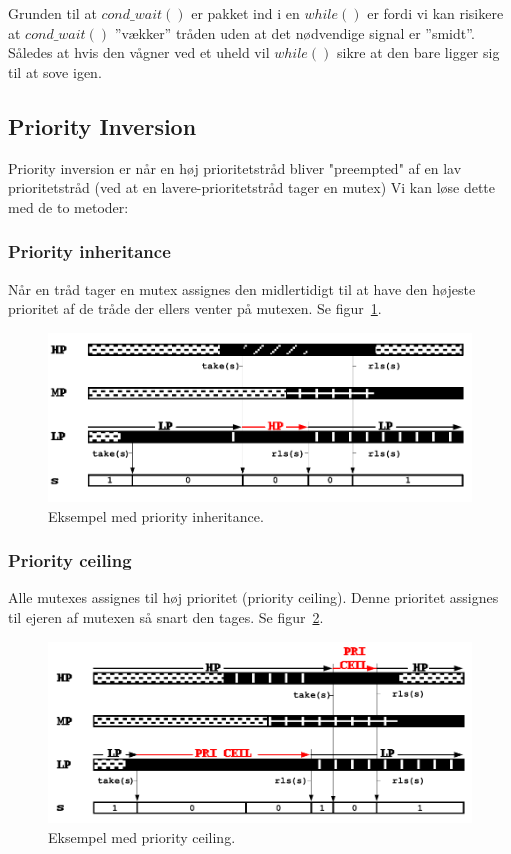 Grunden til at $cond\_wait()$ er pakket ind i en $while()$ er fordi vi kan risikere at $cond\_wait()$ ''vækker'' tråden uden at det nødvendige signal er ''smidt''. Således at hvis den vågner ved et uheld vil $while()$ sikre at den bare ligger sig til at sove igen.\\

\subsection{Priority Inversion}
Priority inversion er når en høj prioritetstråd bliver "preempted" af en lav prioritetstråd (ved at en lavere-prioritetstråd tager en mutex)
Vi kan løse dette med de to metoder:

\subsubsection{Priority inheritance}
Når en tråd tager en mutex assignes den midlertidigt til at have den højeste prioritet af de tråde der ellers venter på mutexen. Se figur~\ref{fig:inher}.
	
\begin{figure}[h]
	\centering
	\includegraphics[width=0.8\linewidth]{figs/spm2/inher}
	\caption{Eksempel med priority inheritance.}
	\label{fig:inher}
\end{figure}

\subsubsection{Priority ceiling}
Alle mutexes assignes til høj prioritet (priority ceiling). Denne prioritet assignes til ejeren af mutexen så snart den tages. Se figur~\ref{fig:ceili}.

\begin{figure}[h]
	\centering
	\includegraphics[width=0.8\linewidth]{figs/spm2/ceili}
	\caption{Eksempel med priority ceiling.}
	\label{fig:ceili}
\end{figure}
	
